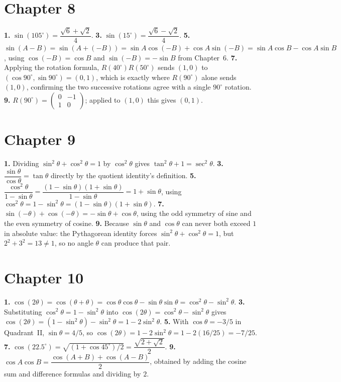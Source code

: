 \section*{Chapter 8}
\textbf{1.} $\sin(105^\circ) = \dfrac{\sqrt6+\sqrt2}{4}$. \quad
\textbf{3.} $\sin(15^\circ) = \dfrac{\sqrt6-\sqrt2}{4}$. \quad
\textbf{5.} $\sin(A-B) = \sin(A+(-B)) = \sin A\cos(-B) + \cos A\sin(-B) =
\sin A\cos B - \cos A\sin B$, using $\cos(-B)=\cos B$ and
$\sin(-B)=-\sin B$ from Chapter~6. \quad
\textbf{7.} Applying the rotation formula, $R(40^\circ)R(50^\circ)$
sends $(1,0)$ to $(\cos90^\circ,\sin90^\circ) = (0,1)$, which is exactly
where $R(90^\circ)$ alone sends $(1,0)$, confirming the two successive
rotations agree with a single $90^\circ$ rotation. \quad
\textbf{9.} $R(90^\circ) = \begin{pmatrix} 0 & -1 \\ 1 & 0
\end{pmatrix}$; applied to $(1,0)$ this gives $(0,1)$.

\section*{Chapter 9}
\textbf{1.} Dividing $\sin^2\theta+\cos^2\theta=1$ by $\cos^2\theta$
gives $\tan^2\theta + 1 = \sec^2\theta$. \quad
\textbf{3.} $\dfrac{\sin\theta}{\cos\theta} = \tan\theta$ directly by the
quotient identity's definition. \quad
\textbf{5.} $\dfrac{\cos^2\theta}{1-\sin\theta} =
\dfrac{(1-\sin\theta)(1+\sin\theta)}{1-\sin\theta} = 1+\sin\theta$,
using $\cos^2\theta = 1-\sin^2\theta = (1-\sin\theta)(1+\sin\theta)$.
\quad
\textbf{7.} $\sin(-\theta)+\cos(-\theta) = -\sin\theta+\cos\theta$, using
the odd symmetry of sine and the even symmetry of cosine. \quad
\textbf{9.} Because $\sin\theta$ and $\cos\theta$ can never both exceed
$1$ in absolute value: the Pythagorean identity forces $\sin^2\theta +
\cos^2\theta = 1$, but $2^2+3^2 = 13 \neq 1$, so no angle $\theta$ can
produce that pair.

\section*{Chapter 10}
\textbf{1.} $\cos(2\theta) = \cos(\theta+\theta) = \cos\theta\cos\theta -
\sin\theta\sin\theta = \cos^2\theta - \sin^2\theta$. \quad
\textbf{3.} Substituting $\cos^2\theta = 1-\sin^2\theta$ into
$\cos(2\theta)=\cos^2\theta-\sin^2\theta$ gives $\cos(2\theta) =
(1-\sin^2\theta)-\sin^2\theta = 1-2\sin^2\theta$. \quad
\textbf{5.} With $\cos\theta=-3/5$ in Quadrant~II, $\sin\theta = 4/5$,
so $\cos(2\theta) = 1-2\sin^2\theta = 1 - 2(16/25) = -7/25$. \quad
\textbf{7.} $\cos(22.5^\circ) = \sqrt{(1+\cos45^\circ)/2} =
\dfrac{\sqrt{2+\sqrt2}}{2}$. \quad
\textbf{9.} $\cos A\cos B = \dfrac{\cos(A+B)+\cos(A-B)}{2}$, obtained by
adding the cosine sum and difference formulas and dividing by $2$.

